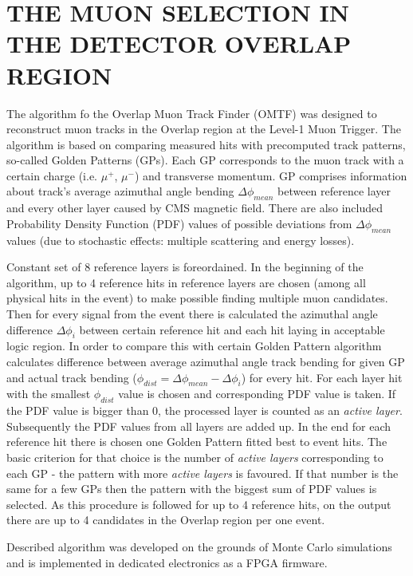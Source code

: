 \section{THE MUON SELECTION IN THE DETECTOR OVERLAP REGION}

The algorithm fo the Overlap Muon Track Finder (OMTF) was designed to reconstruct muon tracks in the Overlap region at the Level-1 Muon Trigger. The algorithm is based on comparing measured hits with precomputed track patterns, so-called Golden Patterns (GPs). Each GP corresponds to the muon track with a certain charge (i.e. $\mu^{+}$, $\mu^{-}$) and transverse momentum. GP comprises information about track's average azimuthal angle bending $\Delta \phi_{mean}$ between reference layer and every other layer caused by CMS magnetic field. There are also included Probability Density Function (PDF) values of possible deviations from $\Delta \phi_{mean}$ values (due to stochastic effects: multiple scattering and energy losses). 

Constant set of 8 reference layers is foreordained. In the beginning of the algorithm, up to 4 reference hits in reference layers are chosen (among all physical hits in the event) to make possible finding multiple muon candidates. Then for every signal from the event there is calculated the azimuthal angle difference $\Delta \phi_{i}$ between certain reference hit and each hit laying in acceptable logic region. In order to compare this with certain Golden Pattern algorithm calculates difference between average azimuthal angle track bending for given GP and actual track bending ($\phi_{dist} = \Delta\phi_{mean} - \Delta\phi_{i}$)%
 for every hit. For each layer hit with the smallest $\phi_{dist}$ value is chosen and corresponding PDF value is taken. If the PDF value is bigger than 0, the processed layer is counted as an \textit{active layer}. Subsequently the PDF values from all layers are added up. In the end for each reference hit there is chosen one Golden Pattern fitted best to event hits. The basic criterion for that choice is the number of \textit{active layers} corresponding to each GP - the pattern with more \textit{active layers} is favoured. If that number is the same for a few GPs then the pattern with the biggest sum of PDF values is selected. As this procedure is followed for up to 4 reference hits, on the output there are up to 4 candidates in the Overlap region per one event.

Described algorithm was developed on the grounds of Monte Carlo simulations and is implemented in dedicated electronics as a FPGA firmware.

\cite{OMTF-Wilga2014}
